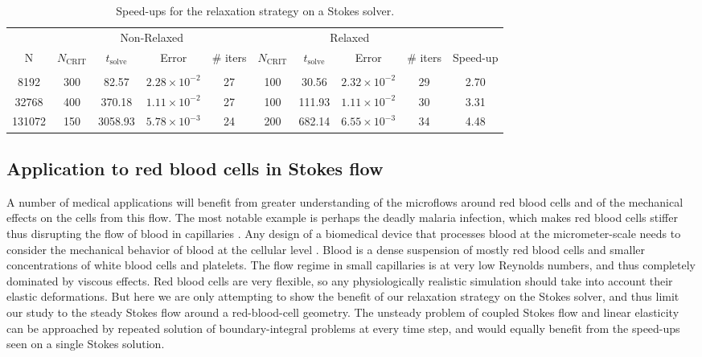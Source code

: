 \documentclass[final,3p,times]{elsarticle}
\newcommand{\ncrit}{N_{\text{CRIT}}}
\newcommand{\tsolve}{t_{\text{solve}}}
\begin{document}
\begin{table}[h]
\footnotesize
\begin{center}
\begin{tabular}{c|cccc|cccc|c}
  & \multicolumn{4}{c|}{Non-Relaxed} & \multicolumn{4}{c|}{Relaxed} &  \\
  N & $\ncrit$ & $\tsolve$ & Error & \# iters & $\ncrit$ & $\tsolve$ & Error & \# iters & Speed-up\\
 \hline
   & & & & & & & & &\\
  8192 & 300 & 82.57 & $2.28\times10^{-2}$ & 27 & 100 & 30.56 & $2.32\times10^{-2}$ & 29 & 2.70\\
  32768 & 400 & 370.18 & $1.11\times10^{-2}$ & 27 & 100 & 111.93 & $1.11\times10^{-2}$ & 30 & 3.31\\
  131072 & 150 & 3058.93 & $5.78\times10^{-3}$ & 24 & 200 & 682.14 & $6.55\times10^{-3}$ & 34 & 4.48\\
 
\end{tabular}
\end{center}
\caption{Speed-ups for the relaxation strategy on a Stokes solver.}
\label{tab:stokes_speedup}
\end{table}%


\subsection{Application to red blood cells in Stokes flow}

A number of medical applications will benefit from greater understanding of the microflows around red blood cells and of the mechanical effects on the cells from this flow. 
The most notable example is perhaps the deadly malaria infection, which makes red blood cells stiffer thus disrupting the flow of blood in capillaries \cite{FedosovETal2011}.
Any design of a biomedical device that processes blood at the micrometer-scale needs to consider the mechanical behavior of blood at the cellular level \cite{Freund2014}. Blood is a dense suspension of mostly red blood cells and smaller concentrations of white blood cells and platelets. The flow regime in small capillaries is at very low Reynolds numbers, and thus completely dominated by viscous effects. 
Red blood cells are very flexible, so any physiologically realistic simulation should take into account their elastic deformations. But here we are only attempting to show the benefit of our relaxation strategy on the Stokes solver, and thus limit our study to the steady Stokes flow around a red-blood-cell geometry. The unsteady problem of coupled Stokes flow and linear elasticity can be approached by repeated solution of boundary-integral problems at every time step, and would equally benefit from the speed-ups seen on a single Stokes solution.
\end{document}
